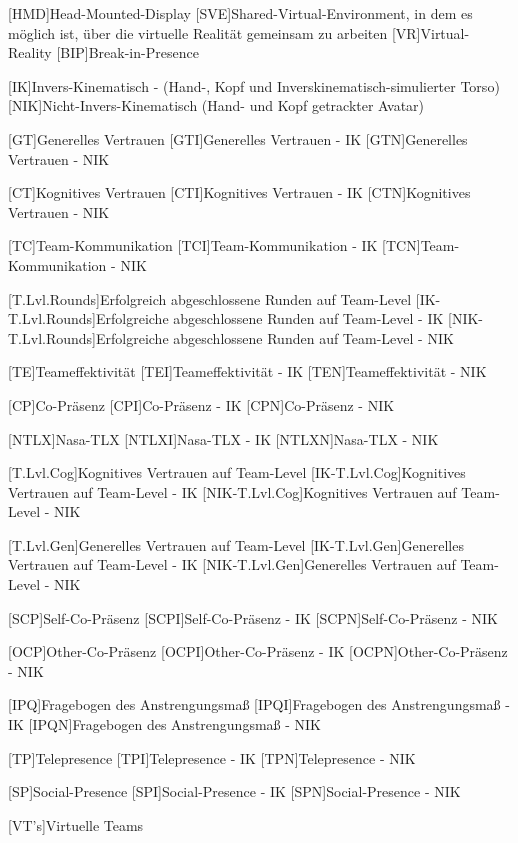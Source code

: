 \begin{acronym}
	[HMD]{Head-Mounted-Display}
	[SVE]{Shared-Virtual-Environment, in dem es möglich ist, über die virtuelle Realität gemeinsam zu arbeiten}
	[VR]{Virtual-Reality}
	[BIP]{Break-in-Presence}
	
	[IK]{Invers-Kinematisch - (Hand-, Kopf und Inverskinematisch-simulierter Torso)}
	[NIK]{Nicht-Invers-Kinematisch (Hand- und Kopf getrackter Avatar)}
	
	[GT]{Generelles Vertrauen}
	[GTI]{Generelles Vertrauen - IK}
	[GTN]{Generelles Vertrauen - NIK}
	
	[CT]{Kognitives Vertrauen}
	[CTI]{Kognitives Vertrauen - IK}
	[CTN]{Kognitives Vertrauen - NIK}
	
	[TC]{Team-Kommunikation}
	[TCI]{Team-Kommunikation - IK}
	[TCN]{Team-Kommunikation - NIK}
	
	[T.Lvl.Rounds]{Erfolgreich abgeschlossene Runden auf Team-Level}
	[IK-T.Lvl.Rounds]{Erfolgreiche abgeschlossene Runden auf Team-Level - IK}
	[NIK-T.Lvl.Rounds]{Erfolgreiche abgeschlossene Runden auf Team-Level - NIK}
	
	[TE]{Teameffektivität}
	[TEI]{Teameffektivität - IK}
	[TEN]{Teameffektivität - NIK}
	
	[CP]{Co-Präsenz}
	[CPI]{Co-Präsenz - IK}
	[CPN]{Co-Präsenz - NIK}
	
	[NTLX]{Nasa-TLX}
	[NTLXI]{Nasa-TLX - IK}
	[NTLXN]{Nasa-TLX - NIK}
	
	[T.Lvl.Cog]{Kognitives Vertrauen auf Team-Level}
	[IK-T.Lvl.Cog]{Kognitives Vertrauen auf Team-Level - IK}
	[NIK-T.Lvl.Cog]{Kognitives Vertrauen auf Team-Level - NIK}
	
	[T.Lvl.Gen]{Generelles Vertrauen auf Team-Level}
	[IK-T.Lvl.Gen]{Generelles Vertrauen auf Team-Level - IK}
	[NIK-T.Lvl.Gen]{Generelles Vertrauen auf Team-Level - NIK}
	
	[SCP]{Self-Co-Präsenz}
	[SCPI]{Self-Co-Präsenz - IK}
	[SCPN]{Self-Co-Präsenz - NIK}	
	
	[OCP]{Other-Co-Präsenz}
	[OCPI]{Other-Co-Präsenz - IK}
	[OCPN]{Other-Co-Präsenz - NIK}	
	
	[IPQ]{Fragebogen des Anstrengungsmaß}
	[IPQI]{Fragebogen des Anstrengungsmaß - IK}
	[IPQN]{Fragebogen des Anstrengungsmaß - NIK}
	
	[TP]{Telepresence}
	[TPI]{Telepresence - IK}
	[TPN]{Telepresence - NIK}	
	
	[SP]{Social-Presence}
	[SPI]{Social-Presence - IK}
	[SPN]{Social-Presence - NIK}
	
	[VT's]{Virtuelle Teams}
\end{acronym}
